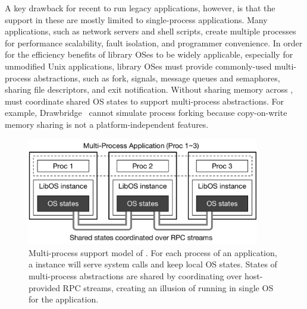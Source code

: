 
A key drawback for recent \liboses{} to run legacy applications, however,
is that the support in these \liboses{} are mostly limited to single-process applications.
Many applications, such as network servers and
shell scripts,
create multiple processes
for
performance scalability, fault isolation, and programmer convenience.
In order for the efficiency benefits of library OSes to be widely applicable,
especially for unmodified Unix applications,
library OSes must provide commonly-used multi-process abstractions,
such as fork,  signals, \sysvipc{} message queues and semaphores, sharing file descriptors, and exit notification.
Without sharing memory across \picoprocs{},
\libos{} must coordinate shared OS states to support multi-process abstractions.
For example, Drawbridge~\cite{porter11drawbridge} cannot simulate process forking because copy-on-write memory sharing is not a platform-independent features.


\begin{figure}[t!]
\centering
\includegraphics[width=4in]{graphene/figures/concept.pdf}
\caption[Multi-process support model of \graphene{} \libos{}]
{Multi-process support model of \graphene{} \libos{}. For each process of an application, a \libos{} instance will serve system calls and keep local OS states. States of multi-process abstractions are shared by coordinating over host-provided RPC streams, creating an illusion of running in single OS for the application.}
\label{fig:graphene:concept}
\end{figure}

